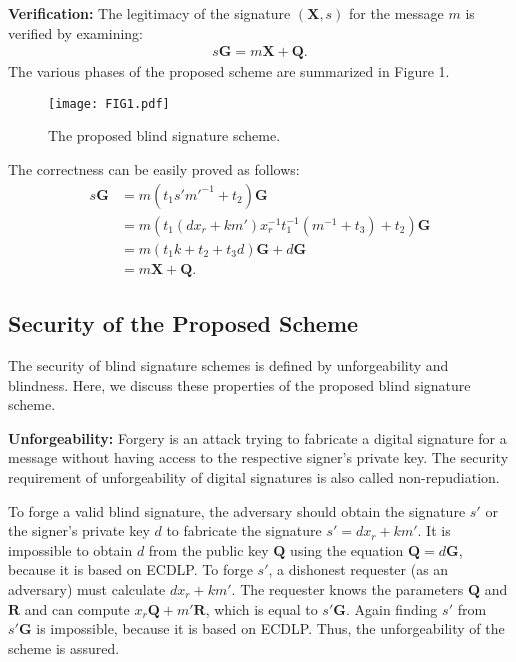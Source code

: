 \documentclass[journal,onecolumn,draftcls]{IEEEtran}
\newcommand{\figwidth}{\columnwidth}\newcommand{\binom}[2]{\genfrac{(}{)}{0pt}{}{#1}{#2}}
\begin{document}
\textbf{Verification:} The legitimacy of the signature $(\textbf{X},s)$ for the message $m$ is verified by examining:
\begin{align}
s\textbf{G} = m\textbf{X} + \textbf{Q}.
\end{align}
The various phases of the proposed scheme are summarized in Figure 1. 

\begin{figure}[t]\centering
\texttt{[image: FIG1.pdf]}\caption{The proposed blind signature scheme.}\label{fig:scheme}\end{figure}

The correctness can be easily proved as follows:
\begin{align}
s\textbf{G}&=m(t_1 s'm'^{-1}+t_2 )\textbf{G} 		\nonumber \\
     &=m(t_1 (dx_r+km') x_r^{-1} t_1^{-1} (m^{-1}+t_3 )+t_2 )\textbf{G} \nonumber \\
     &=m(t_1 k+t_2+t_3 d)\textbf{G}+d\textbf{G} \nonumber \\
     &=m\textbf{X}+\textbf{Q}.
\end{align}


\subsection{Security of the Proposed Scheme}
The security of blind signature schemes is defined by unforgeability and blindness. Here, we discuss these properties of the proposed blind signature scheme.

\textbf{Unforgeability:} Forgery is an attack trying to fabricate a digital signature for a message without having access to the respective signer's private key. The security requirement of unforgeability of digital signatures is also called non-repudiation.

To forge a valid blind signature, the adversary should obtain the signature $s'$ or the signer's private key $d$ to fabricate the signature $s'=dx_r+km'$. It is impossible to obtain $d$ from the public key $\textbf{Q}$ using the equation $\textbf{Q}=d\textbf{G}$, because it is based on ECDLP. To forge $s'$, a dishonest requester (as an adversary) must calculate $dx_r+km'$. The requester knows the parameters $\textbf{Q}$ and $\textbf{R}$ and can compute $x_r \textbf{Q}+m'\textbf{R}$, which is equal to $s'\textbf{G}$. Again finding $s'$ from $s'\textbf{G}$ is impossible, because it is based on ECDLP. Thus, the unforgeability of the scheme is assured.
\end{document}
